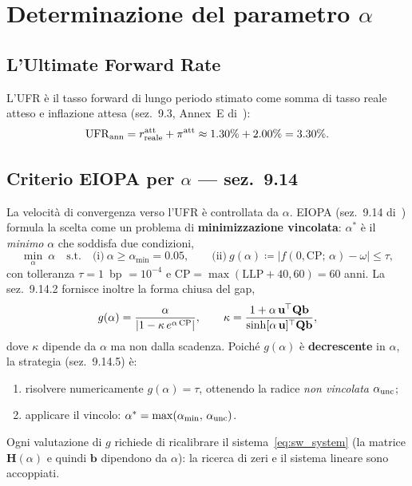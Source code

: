 \documentclass[11pt,a4paper]{article}
\theoremstyle{plain}
\theoremstyle{definition}
\theoremstyle{remark}
\newcommand{\UFR}{\mathrm{UFR}}
\newcommand{\LLP}{\mathrm{LLP}}
\newcommand{\CP}{\mathrm{CP}}
\newcommand{\bfb}{\mathbf{b}}
\newcommand{\bfu}{\mathbf{u}}
\newcommand{\Hmat}{\mathbf{H}}
\newcommand{\Qmat}{\mathbf{Q}}
\newcommand{\transp}{^{\mskip-1mu\top}}
\newcommand{\abs}[1]{\left\lvert #1 \right\rvert}
\newcommand{\defeq}{\coloneqq}
\begin{document}
\section{Determinazione del parametro $\alpha$}
\label{sec:alpha}

\subsection{L'Ultimate Forward Rate}

L'UFR \`e il tasso forward di lungo periodo stimato come somma di
tasso reale atteso e inflazione attesa (sez.~9.3, Annex~E di~\cite{eiopa2025}):
\[
  \UFR_{\rm ann} = r_{\rm reale}^{\rm att} + \pi^{\rm att}
  \approx 1.30\% + 2.00\% = 3.30\%.
\]

\subsection{Criterio EIOPA per $\alpha$ --- sez.~9.14}
\label{sec:criterio_alpha}

La velocit\`a di convergenza verso l'UFR \`e controllata da $\alpha$. EIOPA
(sez.~9.14 di~\cite{eiopa2025}) formula la scelta come un problema di
\textbf{minimizzazione vincolata}: $\alpha^*$ è il \emph{minimo} $\alpha$ che
soddisfa due condizioni,
\begin{equation}
  \label{eq:alpha_crit}
  \min_{\alpha}\ \alpha
  \quad\text{s.t.}\quad
  \text{(i)}\ \alpha \ge \alpha_{\min}=0.05,
  \qquad
  \text{(ii)}\ g(\alpha)\defeq \abs{f(0,\CP;\,\alpha) - \omega} \le \tau,
\end{equation}
con tolleranza $\tau = 1$~bp $=10^{-4}$ e $\CP=\max(\LLP+40,60)=60$ anni.
La sez.~9.14.2 fornisce inoltre la forma chiusa del gap,
\[
  g(\alpha) = \frac{\alpha}{\abs{1-\kappa\,e^{\alpha\,\CP}}},
  \qquad
  \kappa = \frac{1+\alpha\,\bfu\transp\Qmat\bfb}{\sinh[\alpha\,\bfu]\transp\Qmat\bfb},
\]
dove $\kappa$ dipende da $\alpha$ ma non dalla scadenza. Poiché $g(\alpha)$ è
\textbf{decrescente} in $\alpha$, la strategia (sez.~9.14.5) è:
\begin{enumerate}
  \item risolvere numericamente $g(\alpha)=\tau$, ottenendo la radice
        \emph{non vincolata} $\alpha_{\rm unc}$;
  \item applicare il vincolo: $\alpha^* = \max(\alpha_{\min},\,\alpha_{\rm unc})$.
\end{enumerate}
Ogni valutazione di $g$ richiede di ricalibrare il sistema~\eqref{eq:sw_system}
(la matrice $\Hmat(\alpha)$ e quindi $\bfb$ dipendono da $\alpha$): la ricerca
di zeri e il sistema lineare sono accoppiati.
\end{document}
